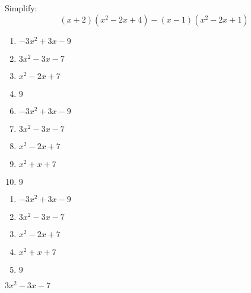  
Simplify:
$$ (x+2)(x^2-2x+4) - (x-1)(x^2-2x+1)$$


\ifsat
	\begin{enumerate}[label=\Alph*)]
		\item $-3x^2+3x-9 $ 
		\item $3x^2-3x-7 $ %
		\item $x^2-2x+7 $ 
		\item $9$
	\end{enumerate}
\else
\fi

\ifacteven
	\begin{enumerate}[label=\textbf{\Alph*.},itemsep=\fill,align=left]
		\setcounter{enumii}{5}
		\item $-3x^2+3x-9 $ 
		\item $3x^2-3x-7 $ %
		\item $x^2-2x+7 $ 
		\addtocounter{enumii}{1}
		\item $x^2+x+7 $
		\item $9$
	\end{enumerate}
\else
\fi

\ifactodd
	\begin{enumerate}[label=\textbf{\Alph*.},itemsep=\fill,align=left]
		\item $-3x^2+3x-9 $ 
		\item $3x^2-3x-7 $ %
		\item $x^2-2x+7 $ 
		\item $x^2+x+7 $
		\item $9$
	\end{enumerate}
\else
\fi

\ifgridin
 $3x^2-3x-7 $ %
		
\else
\fi

